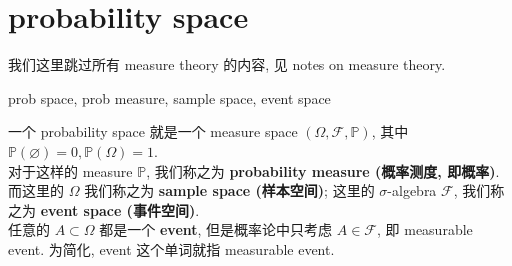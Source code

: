 \documentclass{qlnotes-export}
\begin{document}
\section{probability space}\label{probability-space}

我们这里跳过所有 measure theory 的内容, 见 notes on measure theory.\\

\begin{definition}{prob space, prob measure, sample space, event space}\label{def-01-combinatorics-prob-space-prob-space-prob-measure-sample-space-event-space}

一个 probability space 就是一个 measure space \((\Omega,\mathcal{F},{\mathbb{P}})\), 其中 \({\mathbb{P}}(\varnothing) = 0,{\mathbb{P}}(\Omega) = 1\).\\
对于这样的 measure \(\mathbb{P}\), 我们称之为 \textbf{probability measure (概率测度, 即概率)}.\\
而这里的 \(\Omega\) 我们称之为 \textbf{sample space (样本空间)}; 这里的 \(\sigma\)-algebra \(\mathcal{F}\), 我们称之为 \textbf{event space (事件空间)}.\\
任意的 \(A \subset \Omega\) 都是一个 \textbf{event}, 但是概率论中只考虑 \(A \in \mathcal{F}\), 即 measurable event. 为简化, event 这个单词就指 measurable event.

\end{definition}
\end{document}
